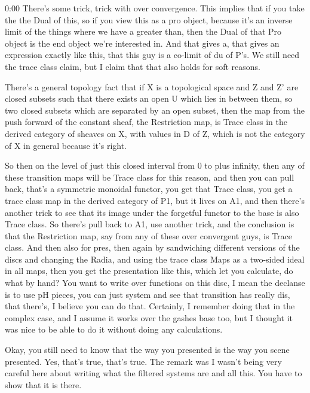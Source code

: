 \begin{unfinished}{0:00}
There's some trick, trick with over convergence. This implies that if you take the the Dual of this, so if you view this as a pro object, because it's an inverse limit of the things where we have a greater than, then the Dual of that Pro object is the end object we're interested in. And that gives a, that gives an expression exactly like this, that this guy is a co-limit of du of P's. We still need the trace class claim, but I claim that that also holds for soft reasons.

There's a general topology fact that if X is a topological space and Z and Z' are closed subsets such that there exists an open U which lies in between them, so two closed subsets which are separated by an open subset, then the map from the push forward of the constant sheaf, the Restriction map, is Trace class in the derived category of sheaves on X, with values in D of Z, which is not the category of X in general because it's right.

So then on the level of just this closed interval from 0 to plus infinity, then any of these transition maps will be Trace class for this reason, and then you can pull back, that's a symmetric monoidal functor, you get that Trace class, you get a trace class map in the derived category of P1, but it lives on A1, and then there's another trick to see that its image under the forgetful functor to the base is also Trace class. So there's pull back to A1, use another trick, and the conclusion is that the Restriction map, say from any of these over convergent guys, is Trace class. And then also for pres, then again by sandwiching different versions of the discs and changing the Radia, and using the trace class Maps as a two-sided ideal in all maps, then you get the presentation like this, which let you calculate, do what by hand? You want to write over functions on this disc, I mean the declanse is to use pH pieces, you can just system and see that transition has really dis, that there's, I believe you can do that. Certainly, I remember doing that in the complex case, and I assume it works over the gashes base too, but I thought it was nice to be able to do it without doing any calculations.

Okay, you still need to know that the way you presented is the way you scene presented. Yes, that's true, that's true. The remark was I wasn't being very careful here about writing what the filtered systems are and all this. You have to show that it is there.


\end{unfinished}
